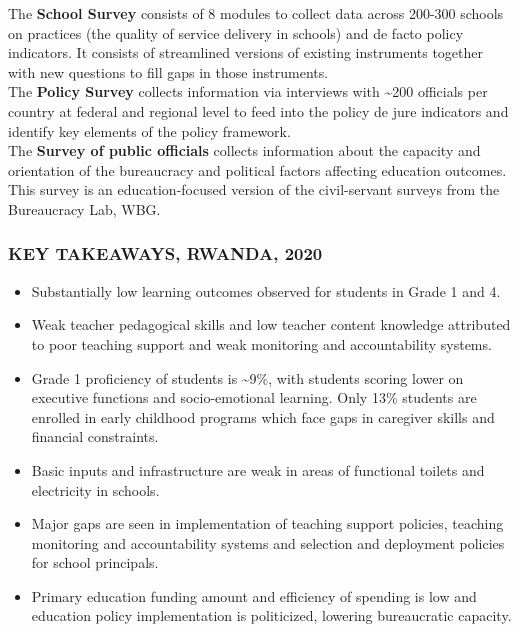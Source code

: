 \documentclass[
  twocolumn]{article}
\providecommand{\tightlist}{%
  \setlength{\itemsep}{0pt}\setlength{\parskip}{0pt}}
\begin{document}
The \textbf{School Survey} consists of 8 modules to collect data across
200-300 schools on practices (the quality of service delivery in
schools) and de facto policy indicators. It consists of streamlined
versions of existing instruments together with new questions to fill
gaps in those instruments.\\
The \textbf{Policy Survey} collects information via interviews with
\textasciitilde200 officials per country at federal and regional level
to feed into the policy de jure indicators and identify key elements of
the policy framework.\\
The \textbf{Survey of public officials} collects information about the
capacity and orientation of the bureaucracy and political factors
affecting education outcomes. This survey is an education-focused
version of the civil-servant surveys from the Bureaucracy Lab, WBG.

\hypertarget{key-takeaways-2020}{%
\subsubsection{\texorpdfstring{\textbf{KEY TAKEAWAYS,
\uppercase{Rwanda},
2020}}{KEY TAKEAWAYS, , 2020}}\label{key-takeaways-2020}}

\begin{itemize}
\tightlist
\item
  Substantially low learning outcomes observed for students in Grade 1
  and 4.
\item
  Weak teacher pedagogical skills and low teacher content knowledge
  attributed to poor teaching support and weak monitoring and
  accountability systems.
\item
  Grade 1 proficiency of students is \textasciitilde9\%, with students
  scoring lower on executive functions and socio-emotional learning.
  Only 13\% students are enrolled in early childhood programs which face
  gaps in caregiver skills and financial constraints.
\item
  Basic inputs and infrastructure are weak in areas of functional
  toilets and electricity in schools.
\item
  Major gaps are seen in implementation of teaching support policies,
  teaching monitoring and accountability systems and selection and
  deployment policies for school principals.
\item
  Primary education funding amount and efficiency of spending is low and
  education policy implementation is politicized, lowering bureaucratic
  capacity.
\end{itemize}
\end{document}
